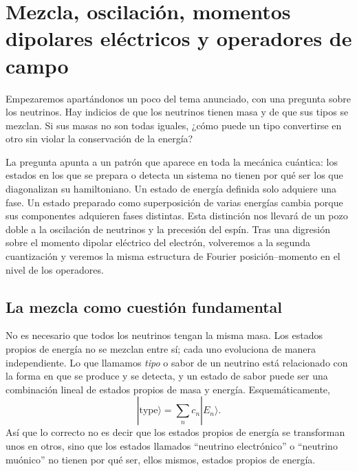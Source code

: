\chapter{Mezcla, oscilación, momentos dipolares eléctricos y operadores de campo}

Empezaremos apartándonos un poco del tema anunciado, con una pregunta sobre los neutrinos. Hay indicios de que los neutrinos tienen masa y de que sus tipos se mezclan. Si sus masas no son todas iguales, ¿cómo puede un tipo convertirse en otro sin violar la conservación de la energía?

La pregunta apunta a un patrón que aparece en toda la mecánica cuántica: los estados en los que se prepara o detecta un sistema no tienen por qué ser los que diagonalizan su hamiltoniano. Un estado de energía definida solo adquiere una fase. Un estado preparado como superposición de varias energías cambia porque sus componentes adquieren fases distintas. Esta distinción nos llevará de un pozo doble a la oscilación de neutrinos y la precesión del espín. Tras una digresión sobre el momento dipolar eléctrico del electrón, volveremos a la segunda cuantización y veremos la misma estructura de Fourier posición--momento en el nivel de los operadores.

\section{La mezcla como cuestión fundamental}

No es necesario que todos los neutrinos tengan la misma masa. Los estados propios de energía no se mezclan entre sí; cada uno evoluciona de manera independiente. Lo que llamamos \emph{tipo} o sabor de un neutrino está relacionado con la forma en que se produce y se detecta, y un estado de sabor puede ser una combinación lineal de estados propios de masa y energía. Esquemáticamente,
\begin{equation}
|\text{type}\rangle = \sum_n c_n |E_n\rangle .
\end{equation}
Así que lo correcto no es decir que los estados propios de energía se transforman unos en otros, sino que los estados llamados ``neutrino electrónico'' o ``neutrino muónico'' no tienen por qué ser, ellos mismos, estados propios de energía.

\begin{classroomqa}
\end{classroomqa}

